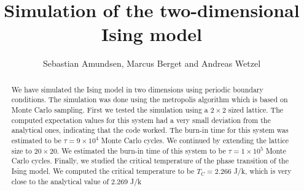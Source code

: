 \documentclass{article}
\begin{document}
\title{Simulation of the two-dimensional Ising model}
\author{Sebastian Amundsen, Marcus Berget and Andreas Wetzel}

\maketitle

\begin{abstract}
We have simulated the Ising model in two dimensions using periodic boundary conditions. The simulation was done using the metropolis algorithm which is based on Monte Carlo sampling. First we tested the simulation using a $2 \times 2$ sized lattice. The computed expectation values for this system had a very small deviation from the analytical ones, indicating that the code worked. The burn-in time for this system was estimated to be $\tau=9\times10^4$ Monte Carlo cycles. We continued by extending the lattice size to $20 \times 20$. We estimated the burn-in time of this system to be $\tau = 1\times10^5$ Monte Carlo cycles. Finally, we studied the critical temperature of the phase transition of the Ising model. We computed the critical temperature to be $T_C=2.266$ J/k, which is very close to the analytical value of 2.269 J/k
\end{abstract}
\end{document}
